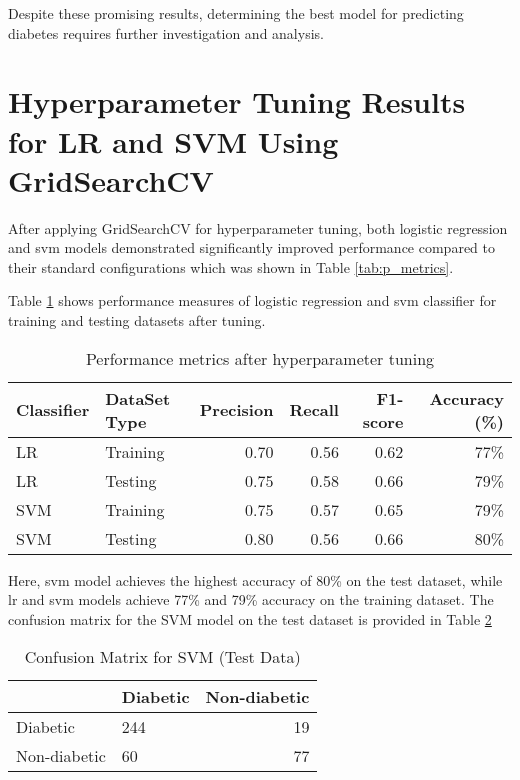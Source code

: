 Despite these promising results, determining the best model for predicting diabetes requires further investigation and analysis.

\section{Hyperparameter Tuning Results for LR and SVM Using GridSearchCV}
After applying GridSearchCV for hyperparameter tuning, both logistic regression and svm models demonstrated significantly improved performance compared to their standard configurations which was shown in Table \ref{tab:p_metrics}. 

Table \ref{tab:gs_p_metrics} shows performance measures of logistic regression and svm classifier for training and testing datasets after tuning.

\begin{table}[h!]
    \centering
    \caption{Performance metrics after hyperparameter tuning}
    \label{tab:gs_p_metrics}
    \begin{tabular}{llrrrr}     
        \toprule
        Classifier  &   DataSet Type &   Precision   &   Recall  &   F1-score    &   Accuracy (\%) \\
        \midrule
        LR  &   Training    &   0.70   &   0.56   &   0.62    &   77\%   \\
        LR  &   Testing &   0.75   &   0.58   &   0.66    &   79\%   \\
        SVM  &   Training    &   0.75   &   0.57   &   0.65    &   79\%   \\
        SVM  &   Testing &   0.80   &   0.56   &   0.66    &   80\%   \\
        \bottomrule
    \end{tabular}
\end{table}

Here, svm model achieves the highest accuracy of 80\% on the test dataset, while lr and svm models achieve 77\% and 79\% accuracy on the training dataset. The confusion matrix for the SVM model on the test dataset is provided in Table \ref{tab:gs_conf_matrix}

\begin{table}[h!]
    \centering
    \caption{Confusion Matrix for SVM (Test Data)}
    \label{tab:gs_conf_matrix}
    \begin{tabular}{llr}     
        \toprule
        & Diabetic  &   Non-diabetic \\
        \midrule
        Diabetic &  244  &   19   \\
        Non-diabetic &  60    &   77  \\
        \bottomrule
    \end{tabular}
\end{table}

